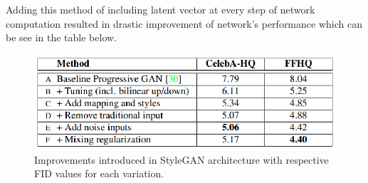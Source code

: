 \documentclass[12pt,a4paper,openany]{book}
\begin{document}
\noindent Adding this method of including latent vector at every step of network computation resulted in drastic improvement of network's performance which can be see in the table below.

\begin{figure}[ht!]
    \centering
    \includegraphics[scale=1.2]{figs/frechet-distance.eps}
    \caption{Improvements introduced in StyleGAN architecture with respective FID values for each variation. \cite{stylegan}}\label{Fig:STYLEGAN}
\end{figure}







\end{document}
